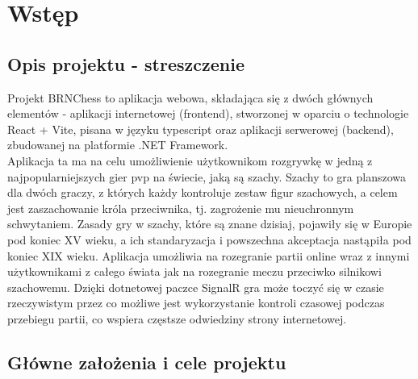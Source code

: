 \documentclass[12pt,a4paper]{article}
\begin{document}
\newpage

\tableofcontents

\newpage
\section{Wstęp}
\subsection{Opis projektu - streszczenie}
    

Projekt BRNChess to aplikacja webowa, składająca się z dwóch głównych elementów - aplikacji internetowej (frontend), stworzonej w oparciu o technologie React + Vite, pisana w języku typescript oraz aplikacji serwerowej (backend), zbudowanej na platformie .NET Framework. 
\\

Aplikacja ta ma na celu umożliwienie użytkownikom rozgrywkę w jedną z najpopularniejszych gier pvp na świecie, jaką są szachy. Szachy to gra planszowa dla dwóch graczy, z których każdy kontroluje zestaw figur szachowych, a celem jest zaszachowanie króla przeciwnika, tj. zagrożenie mu nieuchronnym schwytaniem. Zasady gry w szachy, które są znane dzisiaj, pojawiły się w Europie pod koniec XV wieku, a ich standaryzacja i powszechna akceptacja nastąpiła pod koniec XIX wieku. Aplikacja umożliwia na rozegranie partii online wraz z innymi użytkownikami z całego świata jak na rozegranie meczu przeciwko silnikowi szachowemu. Dzięki dotnetowej paczce SignalR gra może toczyć się w czasie rzeczywistym przez co możliwe jest wykorzystanie kontroli czasowej podczas przebiegu partii, co wspiera częstsze odwiedziny strony internetowej.

\subsection{Główne założenia i cele projektu}
\end{document}
